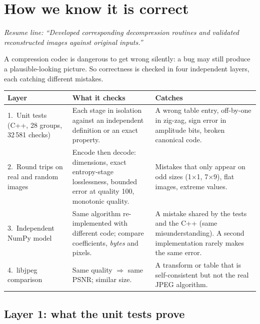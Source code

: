 \chapter{How we know it is correct}\label{ch:testing}

\emph{Resume line: ``Developed corresponding decompression routines and validated reconstructed images against original inputs.''}

A compression codec is dangerous to get wrong silently: a bug may still produce a plausible-looking picture. So correctness is checked in four independent layers, each catching different mistakes.

\begin{center}
\begin{tabular}{@{}p{3.1cm}p{5.5cm}p{6.2cm}@{}}
\toprule
\textbf{Layer} & \textbf{What it checks} & \textbf{Catches}\\ \midrule
1.\ Unit tests (C++, 28 groups, 32\,581 checks) & Each stage in isolation against an independent definition or an exact property. & A wrong table entry, off-by-one in zig-zag, sign error in amplitude bits, broken canonical code.\\
2.\ Round trips on real and random images & Encode then decode: dimensions, exact entropy-stage losslessness, bounded error at quality 100, monotonic quality. & Mistakes that only appear on odd sizes (1$\times$1, 7$\times$9), flat images, extreme values.\\
3.\ Independent NumPy model & Same algorithm re-implemented with different code; compare coefficients, \emph{bytes} and pixels. & A mistake shared by the tests and the C++ (same misunderstanding). A second implementation rarely makes the same error.\\
4.\ libjpeg comparison & Same quality $\Rightarrow$ same PSNR; similar size. & A transform or table that is self-consistent but not the real JPEG algorithm.\\ \bottomrule
\end{tabular}
\end{center}

\section{Layer 1: what the unit tests prove}

